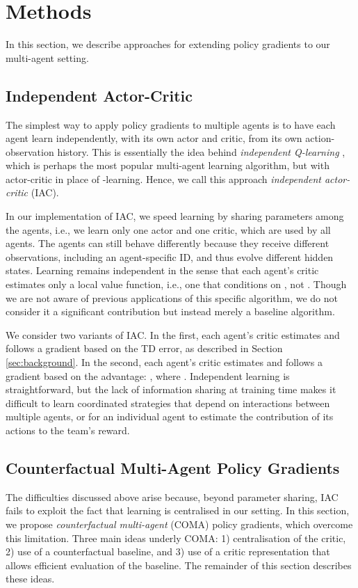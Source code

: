 \documentclass[letterpaper]{article}
\newcommand{\citep}{\cite}
\begin{document}
\section{Methods}
\label{sec:methods}

In this section, we describe approaches for extending policy gradients to our multi-agent setting.

\subsection{Independent Actor-Critic}
The simplest way to apply policy gradients to multiple agents is to have each agent learn independently, with its own actor and critic, from its own action-observation history.  This is essentially the idea behind \emph{independent Q-learning} \citep{tan1993multi}, which is perhaps the most popular multi-agent learning algorithm, but with actor-critic in place of -learning.  Hence, we call this approach \emph{independent actor-critic} (IAC).  

In our implementation of IAC, we speed learning by sharing parameters among the 
agents, i.e., we learn only one actor and one critic, which are used by all 
agents. The agents can still behave differently because they receive different 
observations, including an agent-specific ID, and thus evolve different hidden 
states.  Learning remains independent in the sense that each agent's critic 
estimates only a local value function, i.e., one that conditions on , not 
. Though we are not aware of previous applications of this specific 
algorithm, we do not consider it a significant contribution but instead merely 
a baseline algorithm.

We consider two variants of IAC. In the first, each agent's critic estimates  and follows a gradient based on the TD error, as described in Section \ref{sec:background}.  In the second, each agent's critic estimates  and follows a gradient based on the advantage: , where . Independent learning is straightforward, but the lack of information sharing at training time makes it difficult to learn coordinated strategies that depend on interactions between multiple agents, or for an individual agent to estimate the contribution of its actions to the team's reward. 

\subsection{Counterfactual Multi-Agent Policy Gradients}
The difficulties discussed above arise because, beyond parameter sharing, IAC fails to exploit the fact that learning is centralised in our setting.  In this section, we propose \emph{counterfactual multi-agent} (COMA) policy gradients, which overcome this limitation.  Three main ideas underly COMA: 1) centralisation of the critic, 2) use of a counterfactual baseline, and 3) use of a critic representation that allows efficient evaluation of the baseline.  The remainder of this section describes these ideas.
\end{document}
